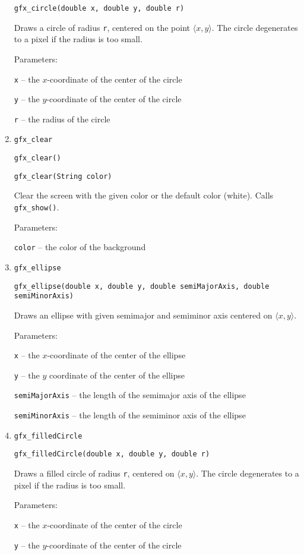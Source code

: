 \begin{enumerate}
      \texttt{gfx\_circle(double x, double y, double r)}

      Draws a circle of radius \texttt{r}, centered on the point $\langle x, y \rangle$.
      The circle degenerates to a pixel if the radius is too small.

      Parameters: 

      \texttt{x} -- the $x$-coordinate of the center of the circle 

      \texttt{y} -- the $y$-coordinate of the center of the circle 

      \texttt{r} -- the radius of the circle
\item \texttt{gfx\_clear}

       \texttt{gfx\_clear()}

       \texttt{gfx\_clear(String color)}

       Clear the screen with the given color or the default color (white). Calls \texttt{gfx\_show()}.

       Parameters: 
       
       \texttt{color} -- the color of the background
\item \texttt{gfx\_ellipse}

      \texttt{gfx\_ellipse(double x, double y, double semiMajorAxis, double semiMinorAxis)}

      Draws an ellipse with given semimajor and semiminor axis centered on $\langle x,y \rangle$.

      Parameters: 

      \texttt{x} -- the $x$-coordinate of the center of the ellipse

      \texttt{y} -- the $y$ coordinate of the center of the ellipse 

      \texttt{semiMajorAxis} -- the length of the semimajor axis of the ellipse 

      \texttt{semiMinorAxis} -- the length of the semiminor axis of the ellipse
\item \texttt{gfx\_filledCircle}

      \texttt{gfx\_filledCircle(double x, double y, double r)}

      Draws a filled circle of radius \texttt{r}, centered on $\langle x, y \rangle$.  The circle
      degenerates to a pixel if the radius is too small.

      Parameters:

      \texttt{x} -- the $x$-coordinate of the center of the circle

      \texttt{y} -- the $y$-coordinate of the center of the circle 


\end{enumerate}
